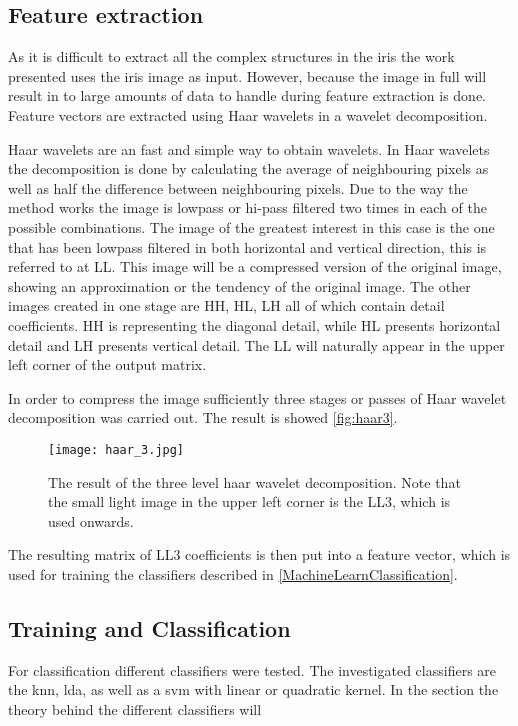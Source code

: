 \subsection{Feature extraction}
As it is difficult to extract all the complex structures in the iris the work presented uses the iris image as input. However, because the image in full will result in to large amounts of data to handle during feature extraction is done. Feature vectors are extracted using Haar wavelets in a wavelet decomposition. 

Haar wavelets are an fast and simple way to obtain wavelets. In Haar wavelets the decomposition is done by calculating the average of neighbouring pixels as well as half the difference between neighbouring pixels. Due to the way the method works the image is lowpass or hi-pass filtered two times in each of the possible combinations. The image of the greatest interest in this case is the one that has been lowpass filtered in both horizontal and vertical direction, this is referred to at LL. This image will be a compressed version of the original image, showing an approximation or the tendency of the original image. The other images created in one stage are HH, HL, LH all of which contain detail coefficients. HH is representing the diagonal detail, while HL presents horizontal detail and LH presents vertical detail. The LL will naturally appear in the upper left corner of the output matrix. 

In order to compress the image sufficiently three stages or passes of Haar wavelet decomposition was carried out. The result is showed \autoref{fig:haar3}. 
\begin{figure}[h]
\centering
\texttt{[image: haar\_3.jpg]}
\caption{The result of the three level haar wavelet decomposition. Note that the small light image in the upper left corner is the LL3, which is used onwards.}
\label{fig:haar3}
\end{figure}
The resulting matrix of LL3 coefficients is then put into a feature vector, which is used for training the classifiers described in \autoref{MachineLearnClassification}.

\subsection{Training and Classification}
\label{MachineLearnClassification}
For classification different classifiers were tested. The investigated classifiers are the \gls{knn}, \gls{lda}, as well as a \gls{svm} with linear or quadratic kernel. In the section the theory behind the different classifiers will


